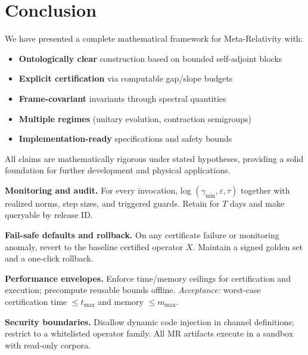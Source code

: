 \documentclass[12]{amsart}
\theoremstyle{plain}
\begin{document}
\section{Conclusion}

We have presented a complete mathematical framework for Meta-Relativity with:
\begin{itemize}
    \item \textbf{Ontologically clear} construction based on bounded self-adjoint blocks
    \item \textbf{Explicit certification} via computable gap/slope budgets  
    \item \textbf{Frame-covariant} invariants through spectral quantities
    \item \textbf{Multiple regimes} (unitary evolution, contraction semigroups)
    \item \textbf{Implementation-ready} specifications and safety bounds
\end{itemize}

All claims are mathematically rigorous under stated hypotheses, providing a solid foundation for further development and physical applications.

\appendix


\item \textbf{Monitoring and audit.}\label{g:audit}
For every invocation, log \((\gamma_{\min}, \varepsilon, \tau)\) together with realized norms, step sizes, and triggered guards. Retain for \(T\) days and make queryable by release ID.


\item \textbf{Fail-safe defaults and rollback.}\label{g:rollback}
On any certificate failure or monitoring anomaly, revert to the baseline certified operator \(X\). Maintain a signed golden set and a one-click rollback.


\item \textbf{Performance envelopes.}\label{g:perf}
Enforce time/memory ceilings for certification and execution; precompute reusable bounds offline.
\emph{Acceptance:} worst-case certification time \(\le t_{\max}\) and memory \(\le m_{\max}\).


\item \textbf{Security boundaries.}\label{g:sec}
Disallow dynamic code injection in channel definitions; restrict to a whitelisted operator family. All MR artifacts execute in a sandbox with read-only corpora.
\end{document}
